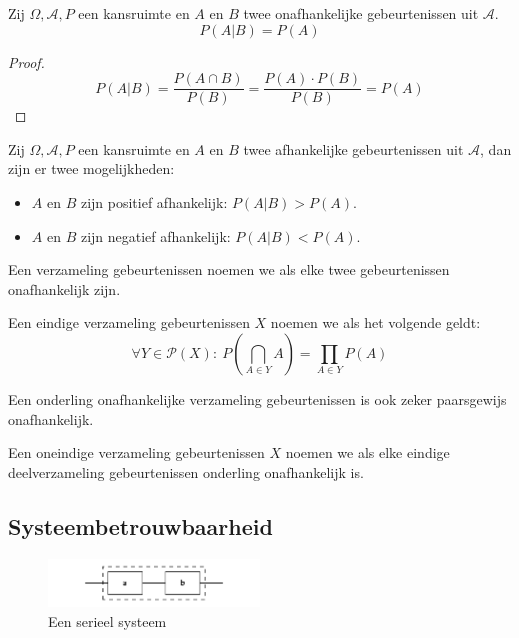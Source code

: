 \documentclass[main.tex]{subfiles}
\begin{document}
\begin{st}
  Zij $\Omega,\mathcal{A},P$ een kansruimte en $A$ en $B$ twee onafhankelijke gebeurtenissen uit $\mathcal{A}$.
  \[ P(A|B) = P(A) \]
  
  \begin{proof}
    \[ P(A|B) = \frac{P(A \cap B)}{P(B)} = \frac{P(A) \cdot P(B)}{P(B)} = P(A) \]
  \end{proof}
\end{st}

\begin{st}
  Zij $\Omega,\mathcal{A},P$ een kansruimte en $A$ en $B$ twee afhankelijke gebeurtenissen uit $\mathcal{A}$, dan zijn er twee mogelijkheden:
  \begin{itemize}
  \item $A$ en $B$ zijn positief afhankelijk: $P(A|B) > P(A)$.
  \item $A$ en $B$ zijn negatief afhankelijk: $P(A|B) < P(A)$.
  \end{itemize}
\end{st}

\begin{de}
  Een verzameling gebeurtenissen noemen we  als elke twee gebeurtenissen onafhankelijk zijn.
\end{de}

\begin{de}
  Een eindige verzameling gebeurtenissen $X$ noemen we  als het volgende geldt:
  \[ \forall Y\in \mathcal{P}(X):\ P\left( \bigcap_{A\in Y}A \right) = \prod_{A\in Y}P(A) \]
\end{de}

\begin{ei}
  Een onderling onafhankelijke verzameling gebeurtenissen is ook zeker paarsgewijs onafhankelijk.
\end{ei}

\begin{de}
  Een oneindige verzameling gebeurtenissen $X$ noemen we  als elke eindige deelverzameling gebeurtenissen onderling onafhankelijk is.
\end{de}

\subsection{Systeembetrouwbaarheid}
\label{sec:syst}

\begin{figure}[H]
  \caption{Een serieel systeem}
  \centering
    \includegraphics[width=0.5\textwidth]{assets/systeem-serieel.png}
\end{figure}
\end{document}
